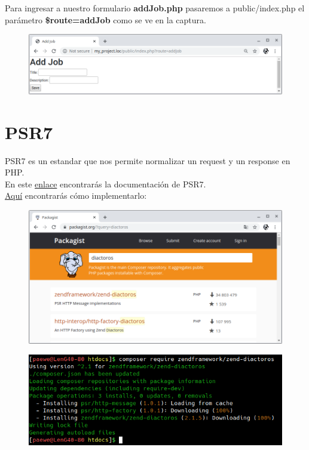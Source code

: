 \documentclass{article}
\begin{document}
Para ingresar a nuestro formulario \textbf{addJob.php} pasaremos a
public/index.php el parámetro \textbf{\$route=addJob} como se ve en la captura.\\

\begin{figure}[h!]
  \centering
  \includegraphics[scale=0.5]{./Pictures/110_front_controller.png}
\end{figure}

\newpage

\section{PSR7}%
PSR7 es un estandar que nos permite normalizar un request y un response en PHP.\\

En este \href{https://www.php-fig.org/psr/psr-7/}{enlace} encontrarás la
documentación de PSR7.\\

\href{https://zendframework.github.io/zend-diactoros/usage/}{Aquí} encontrarás
cómo implementarlo:\\

\begin{figure}[h!]
  \centering
  \includegraphics[scale=0.5]{./Pictures/111_zend_diactoros.png}
\end{figure}

\begin{figure}[h!]
  \centering
  \includegraphics[scale=0.75]{./Pictures/112_composer_diactoros.png}
\end{figure}
\end{document}
